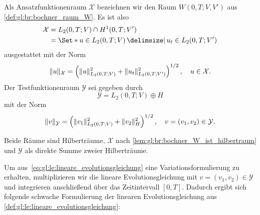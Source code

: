 \begin{Definition}
\label{def:gl:le:ansatz_und_testraum}
    Als Ansatzfunktionenraum $\mathcal X$ bezeichnen wir den Raum $W(0, T; V, V')$ aus \cref{def:gl:br:bochner_raum_W}.
    Es ist also
    \begin{equation}
        \label{eq:gl:le:ansatzraum_X}
        \begin{aligned}
            \mathcal X &= L_{2}(0, T; V) \cap H^{1}(0, T; V')
            \\&= \Set*{ u \in L_{2}(0, T; V) \given u_{t} \in L_{2}(0, T; V') }
        \end{aligned}
    \end{equation}
    ausgestattet mit der Norm
    \begin{equation}
        \label{eq:gl:le:ansatzraum_X_norm}
        \lVert u\rVert_{\mathcal X} = \left( \lVert u\rVert_{L_{2}{(0, T; V)}}^{2} + \lVert u_{t}\rVert_{L_{2}{(0, T; V')}}^{2} \right)^{1 / 2}, \quad u \in \mathcal X.
    \end{equation}
    Der Testfunktionenraum $\mathcal Y$ sei gegeben durch
    \begin{equation}
        \label{eq:gl:le:testraum_Y}
        \mathcal Y = L_{2}(0, T; V) \oplus H
    \end{equation}
    mit der Norm
    \begin{equation}
        \label{eq:gl:le:testraum_Y_norm}
        \lVert v\rVert_{\mathcal Y} = \left( \lVert v_{1}\rVert_{L_{2}(0, T; V)}^{2} + \lVert v_{2}\rVert_{H}^{2} \right)^{1 / 2}, \quad v = (v_{1}, v_{2}) \in \mathcal Y.
    \end{equation}
\end{Definition}

Beide Räume sind Hilberträume, $\mathcal X$ nach \cref{lem:gl:br:bochner_W_ist_hilbertraum} und $\mathcal Y$ als direkte Summe zweier Hilberträume.

Um aus~\cref{eq:gl:le:lineare_evolutionsgleichung} eine Variationsformulierung zu erhalten, multiplizieren wir die lineare Evolutionsgleichung mit $v = (v_{1}, v_{2}) \in \mathcal Y$ und integrieren anschließend über das Zeitintervall $[0, T]$.
Dadurch ergibt sich folgende schwache Formulierung der linearen Evolutionsgleichung aus \cref{def:gl:le:lineare_evolutionsgleichung}:

